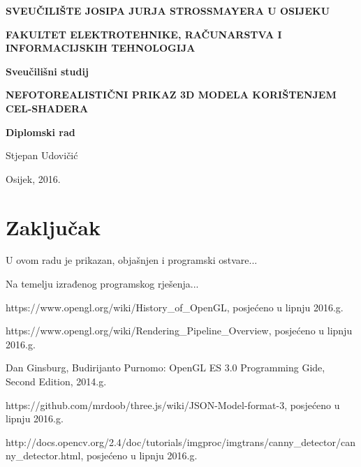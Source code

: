 \documentclass[a4paper,12pt]{extarticle}
\begin{document}
\begin{titlepage}
	\centering
	{\bfseries SVEUČILIŠTE JOSIPA JURJA STROSSMAYERA U OSIJEKU\par}
	{\bfseries FAKULTET ELEKTROTEHNIKE, RAČUNARSTVA I INFORMACIJSKIH TEHNOLOGIJA\par}
	
	\vspace{2cm}
	{\bfseries Sveučilišni studij\par}

	\vspace{4cm}
	{\huge\bfseries NEFOTOREALISTIČNI PRIKAZ 3D MODELA KORIŠTENJEM CEL-SHADERA\par}
	
	\vspace{1cm}
	{\bfseries Diplomski rad\par}
	
	\vspace{2cm}
	{\Large Stjepan Udovičić\par}
	
	\vfill
	{Osijek, 2016.\par}
\end{titlepage}

\tableofcontents











\section{Zaključak}

U ovom radu je prikazan, objašnjen i programski ostvare...


Na temelju izrađenog programskog rješenja...

\begin{thebibliography}{9}

	https://www.opengl.org/wiki/History\_of\_OpenGL, posjećeno u lipnju 2016.g.

	https://www.opengl.org/wiki/Rendering\_Pipeline\_Overview, posjećeno u lipnju 2016.g.
	
	Dan Ginsburg, Budirijanto Purnomo: OpenGL ES 3.0 Programming Gide, Second Edition, 2014.g.

	https://github.com/mrdoob/three.js/wiki/JSON-Model-format-3, posjećeno u lipnju 2016.g.

	http://docs.opencv.org/2.4/doc/tutorials/imgproc/imgtrans/canny\_detector/canny\_detector.html, posjećeno u lipnju 2016.g.

\end{thebibliography}
\end{document}
